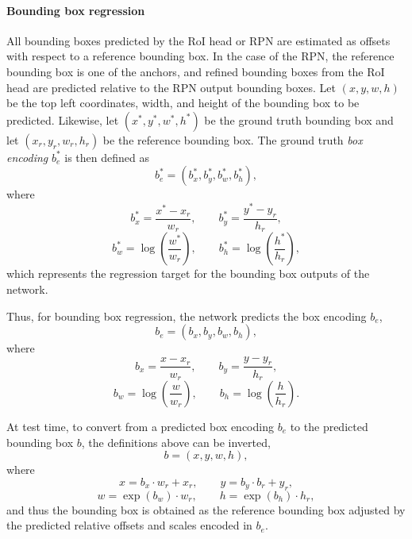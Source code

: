 \label{ssec:rcnn_techn}
\paragraph{Bounding box regression}
All bounding boxes predicted by the RoI head or RPN are estimated as offsets
with respect to a reference bounding box. In the case of the RPN,
the reference bounding box is one of the anchors, and refined bounding boxes from the RoI head are
predicted relative to the RPN output bounding boxes.
Let $(x, y, w, h)$ be the top left coordinates, width, and height of the bounding box
to be predicted. Likewise, let $(x^*, y^*, w^*, h^*)$ be the ground truth bounding
box and let $(x_r, y_r, w_r, h_r)$ be the reference bounding box.
The ground truth \emph{box encoding} $b_e^*$ is then defined as
\begin{equation}
b_e^* = (b_x^*, b_y^*, b_w^*, b_h^*),
\end{equation}
where
\begin{equation*}
b_x^* = \frac{x^* - x_r}{w_r},
\qquad
b_y^* = \frac{y^* - y_r}{h_r},
\end{equation*}
\begin{equation*}
b_w^* = \log \left( \frac{w^*}{w_r} \right),
\qquad
b_h^* = \log \left( \frac{h^*}{h_r} \right),
\end{equation*}
which represents the regression target for the bounding box
outputs of the network.

Thus, for bounding box regression, the network predicts the box encoding $b_e$,
\begin{equation}
b_e = (b_x, b_y, b_w, b_h),
\end{equation}
where
\begin{equation*}
b_x = \frac{x - x_r}{w_r},
\qquad
b_y = \frac{y - y_r}{h_r},
\end{equation*}
\begin{equation*}
b_w = \log \left( \frac{w}{w_r} \right),
\qquad
b_h = \log \left( \frac{h}{h_r} \right).
\end{equation*}

At test time, to convert from a predicted box encoding $b_e$ to the predicted bounding box $b$,
the definitions above can be inverted,
\begin{equation}
b = (x, y, w, h),
\label{eq:pred_bounding_box}
\end{equation}
where
\begin{equation*}
x = b_x \cdot w_r + x_r,
\qquad
y = b_y \cdot b_r + y_r,
\end{equation*}
\begin{equation*}
w = \exp(b_w) \cdot w_r,
\qquad
h = \exp(b_h) \cdot h_r,
\end{equation*}
and thus the bounding box is obtained as the reference bounding box adjusted by
the predicted relative offsets and scales encoded in $b_e$.

